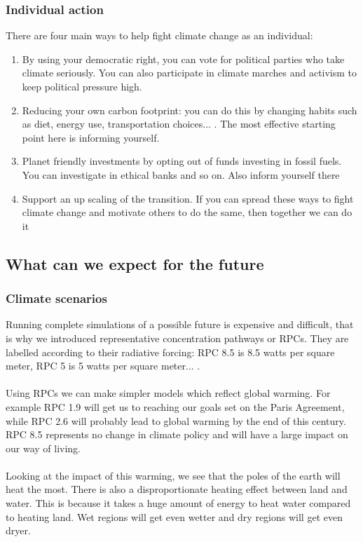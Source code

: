 \documentclass[../summary.tex]{subfiles}
\begin{document}
			\subsubsection{Individual action} 
				There are four main ways to help fight climate change as an individual:
				\begin{enumerate}
					\item By using your democratic right, you can vote for political parties who take climate seriously. You can also participate in climate marches and activism to keep political pressure high. 
					\item Reducing your own carbon footprint: you can do this by changing habits such as diet, energy use, transportation choices... . The most effective starting point here is informing yourself. 
					\item Planet friendly investments by opting out of funds investing in fossil fuels. You can investigate in ethical banks and so on. Also inform yourself there
					\item Support an up scaling of the transition. If you can spread these ways to fight climate change and motivate others to do the same, then together we can do it
				\end{enumerate}
				
		\subsection{What can we expect for the future}
			\subsubsection{Climate scenarios}
				Running complete simulations of a possible future is expensive and difficult, that is why we introduced  representative concentration pathways or RPCs. They are labelled according to their radiative forcing: RPC 8.5 is 8.5 watts per square meter, RPC 5 is 5 watts per square meter... . \\
				\\
				Using RPCs we can make simpler models which reflect global warming. For example RPC 1.9 will get us to reaching our goals set on the Paris Agreement, while RPC 2.6 will probably lead to global warming by the end of this century. RPC 8.5 represents no change in climate policy and will have a large impact on our way of living. \\
				\\
				Looking at the impact of this warming, we see that the poles of the earth will heat the most. There is also a disproportionate heating effect between land and water. This is because it takes a huge amount of energy to heat water compared to heating land. Wet regions will get even wetter and dry regions will get even dryer. 
				
\end{document}
